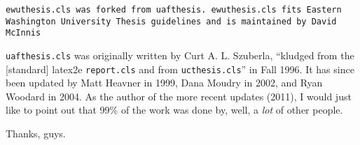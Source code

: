 \texttt{ewuthesis.cls was forked from uafthesis.  ewuthesis.cls fits Eastern Washington University Thesis guidelines and is maintained by David McInnis}


\texttt{uafthesis.cls} was originally written by Curt A. L. Szuberla, ``kludged from the [standard] latex2e \texttt{report.cls} and from \texttt{ucthesis.cls}''
in Fall 1996. It has since been updated by Matt Heavner in 1999, Dana Moudry in
2002, and Ryan Woodard in 2004. As the author of the more recent updates (2011),
I would just like to point out that 99\% of the work was done by, well, a
\emph{lot} of other people.

Thanks, guys.
